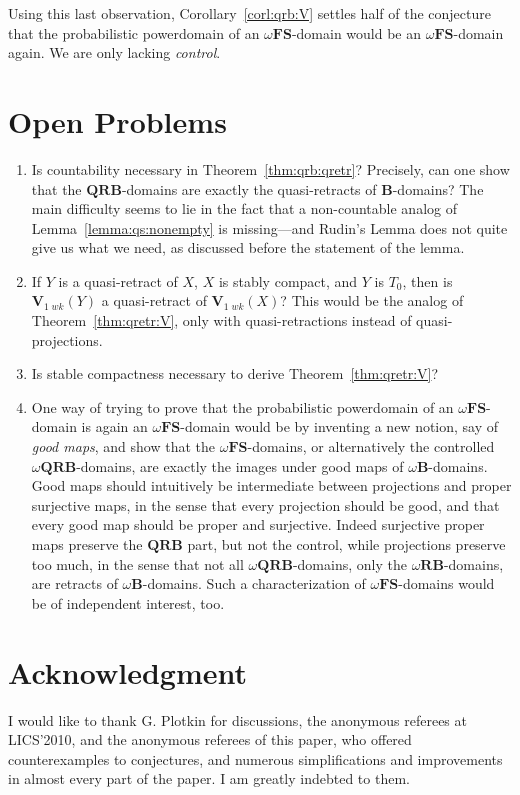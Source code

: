 \documentclass{LMCS}
\newcommand\QRB{\mathbf{QRB}}
\newcommand\B{\mathbf{B}}
\newcommand\RB{\mathbf{RB}}
\newcommand\FS{\mathbf{FS}}
\newcommand\Val{\mathbf V}
\begin{document}
Using this last observation, Corollary~\ref{corl:qrb:V} settles half
of the conjecture that the probabilistic powerdomain of an
$\omega\FS$-domain would be an $\omega\FS$-domain again.  We are only
lacking {\em control\/}.

\section*{Open Problems}

\begin{enumerate}[(1)]
\item Is countability necessary in Theorem~\ref{thm:qrb:qretr}?
  Precisely, can one show that the $\QRB$-domains are exactly the
  quasi-retracts of $\B$-domains?  The main difficulty seems to lie in
  the fact that a non-countable analog of
  Lemma~\ref{lemma:qs:nonempty} is missing---and Rudin's Lemma does
  not quite give us what we need, as discussed before the statement
  of the lemma.
\item If $Y$ is a quasi-retract of $X$, $X$ is stably compact, and $Y$
  is $T_0$, then is $\Val_{1\;wk} (Y)$ a quasi-retract of
  $\Val_{1\;wk} (X)$?  This would be the analog of
  Theorem~\ref{thm:qretr:V}, only with quasi-retractions instead of
  quasi-projections.
\item Is stable compactness necessary to derive Theorem~\ref{thm:qretr:V}?
\item One way of trying to prove that the probabilistic powerdomain of
  an $\omega\FS$-domain is again an $\omega\FS$-domain would be by
  inventing a new notion, say of \emph{good maps}, and show that the
  $\omega\FS$-domains, or alternatively the controlled
  $\omega\QRB$-domains, are exactly the images under good maps of
  $\omega\B$-domains.  Good maps should intuitively be intermediate
  between projections and proper surjective maps, in the sense that
  every projection should be good, and that every good map should be
  proper and surjective.  Indeed surjective proper maps preserve the
  $\QRB$ part, but not the control, while projections preserve too
  much, in the sense that not all $\omega\QRB$-domains, only the
  $\omega\RB$-domains, are retracts of $\omega\B$-domains.  Such a
  characterization of $\omega\FS$-domains would be of independent
  interest, too.
\end{enumerate}

\section*{Acknowledgment}

I would like to thank G. Plotkin for discussions, the anonymous
referees at LICS'2010, and the anonymous referees of this paper, who
offered counterexamples to conjectures, and numerous simplifications
and improvements in almost every part of the paper.  I am greatly
indebted to them.







\end{document}
